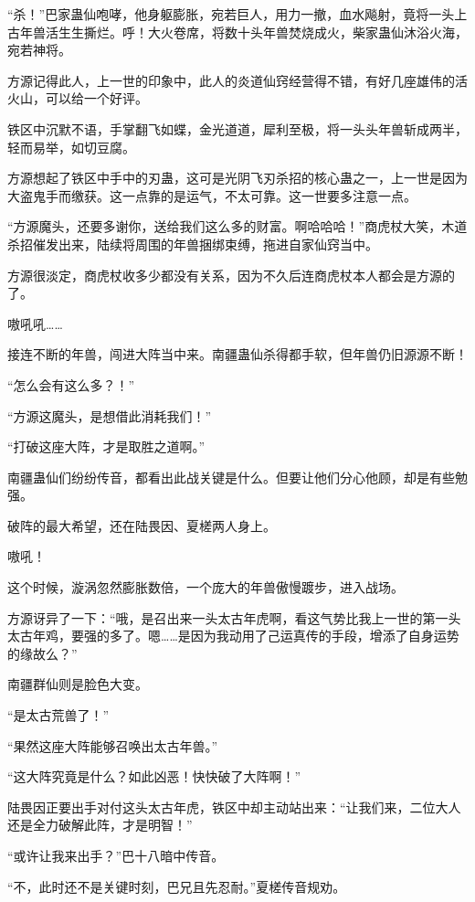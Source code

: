 
\begin{this_body}

“杀！”巴家蛊仙咆哮，他身躯膨胀，宛若巨人，用力一撤，血水飚射，竟将一头上古年兽活生生撕烂。呼！大火卷席，将数十头年兽焚烧成火，柴家蛊仙沐浴火海，宛若神将。

方源记得此人，上一世的印象中，此人的炎道仙窍经营得不错，有好几座雄伟的活火山，可以给一个好评。

铁区中沉默不语，手掌翻飞如蝶，金光道道，犀利至极，将一头头年兽斩成两半，轻而易举，如切豆腐。

方源想起了铁区中手中的刃蛊，这可是光阴飞刃杀招的核心蛊之一，上一世是因为大盗鬼手而缴获。这一点靠的是运气，不太可靠。这一世要多注意一点。

“方源魔头，还要多谢你，送给我们这么多的财富。啊哈哈哈！”商虎杖大笑，木道杀招催发出来，陆续将周围的年兽捆绑束缚，拖进自家仙窍当中。

方源很淡定，商虎杖收多少都没有关系，因为不久后连商虎杖本人都会是方源的了。

嗷吼吼……

接连不断的年兽，闯进大阵当中来。南疆蛊仙杀得都手软，但年兽仍旧源源不断！

“怎么会有这么多？！”

“方源这魔头，是想借此消耗我们！”

“打破这座大阵，才是取胜之道啊。”

南疆蛊仙们纷纷传音，都看出此战关键是什么。但要让他们分心他顾，却是有些勉强。

破阵的最大希望，还在陆畏因、夏槎两人身上。

嗷吼！

这个时候，漩涡忽然膨胀数倍，一个庞大的年兽傲慢踱步，进入战场。

方源讶异了一下：“哦，是召出来一头太古年虎啊，看这气势比我上一世的第一头太古年鸡，要强的多了。嗯……是因为我动用了己运真传的手段，增添了自身运势的缘故么？”

南疆群仙则是脸色大变。

“是太古荒兽了！”

“果然这座大阵能够召唤出太古年兽。”

“这大阵究竟是什么？如此凶恶！快快破了大阵啊！”

陆畏因正要出手对付这头太古年虎，铁区中却主动站出来：“让我们来，二位大人还是全力破解此阵，才是明智！”

“或许让我来出手？”巴十八暗中传音。

“不，此时还不是关键时刻，巴兄且先忍耐。”夏槎传音规劝。


\end{this_body}
